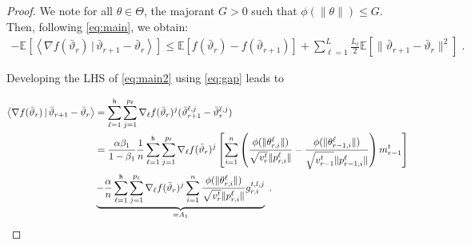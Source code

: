 \documentclass[11pt]{article}
\newcommand{\eqsp}{\;}
\def\EE{\mathbb{E}}
\newcommand{\pscal}[2]{\left\langle#1\,|\,#2 \right\rangle}
\def\tot{\mathsf{h}}
\begin{document}
\begin{proof}
We note for all $\theta \in \Theta$, the majorant $G > 0$ such that $\phi(\|\theta \|) \leq G$. 
Then, following \eqref{eq:main}, we obtain:
\begin{align}\label{eq:main2}
- \EE[  \pscal{\nabla f(\bar{\vartheta}_r)}{\bar{\vartheta}_{r+1} - \bar{\vartheta}_r}]  \leq  \EE[ f(\bar{\vartheta}_r) - f(\bar{\vartheta}_{r+1})] + \sum_{\ell =1}^L \frac{L_\ell}{2} \EE[  \| \bar{\vartheta}_{r+1} - \bar{\vartheta}_r \|^2] \eqsp.
\end{align}

Developing the LHS of \eqref{eq:main2} using \eqref{eq:gap} leads to

\begin{align} \label{eqn1}
\pscal{\nabla f(\bar{\vartheta}_r)}{\bar{\vartheta}_{r+1} - \bar{\vartheta}_r} &= \sum_{\ell=1}^\tot \sum_{j=1}^{p_\ell} \nabla_{\ell} f(\bar{\vartheta}_r)^j (\bar{\vartheta}^{\ell,j}_{r+1} - \bar{\vartheta}^{\ell,j}_r)  \\ \notag
& =  \frac{\alpha \beta_1}{1-\beta_1}\frac{1}{n}  \sum_{\ell=1}^\tot \sum_{j=1}^{p_\ell} \nabla_{\ell} f(\bar{\vartheta}_r)^j \left[   \sum_{i = 1}^n  \left( \frac{\phi(\|\theta_{r,i}^{\ell}\|)}{\sqrt{v^{t}_{r}} \|p_{r,i}^{\ell}\|} - \frac{\phi(\|\theta_{r-1,i}^{\ell}\|)}{\sqrt{v^{t}_{r-1}} \|p_{r-1,i}^{\ell}\|} \right) m^{t}_{r-1}  \right] \\ \notag
& \underbrace{ -\frac{\alpha}{n} \sum_{\ell=1}^\tot \sum_{j=1}^{p_\ell} \nabla_{\ell} f(\bar{\vartheta}_r)^j  \sum_{i = 1}^n \frac{\phi(\|\theta_{r,i}^{\ell}\|)}{\sqrt{v^{t}_{r}} \|p_{r,i}^{\ell}\|} g_{r,i}^{t,l,j}}_{= A_1}   \eqsp.
\end{align}




\end{proof}
\end{document}
